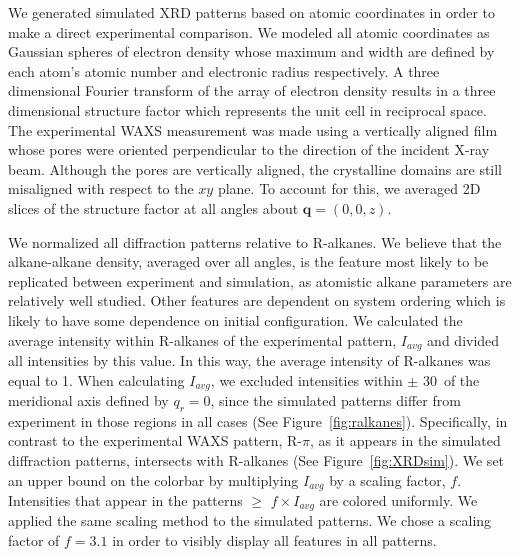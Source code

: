 \documentclass[journal=jpcbfk,manuscript=article]{achemso}
\begin{document}
  We generated simulated XRD patterns based on atomic coordinates in order to
  make a direct experimental comparison. We modeled all atomic coordinates as
  Gaussian spheres of electron density whose maximum and width are defined by
  each atom's atomic number and electronic radius respectively. A three dimensional
  Fourier transform of the array of electron density results in a three
  dimensional structure factor which represents the unit cell in reciprocal
  space. The experimental WAXS measurement was made using a vertically aligned
  film whose pores were oriented perpendicular to the direction of the incident
  X-ray beam. 
  Although the pores are vertically aligned, the crystalline domains are
  still misaligned with respect to the $xy$ plane. To account for this, we averaged
  2D slices of the structure factor at all angles about $\mathbf{q} = (0, 0, z)$. 

  We normalized all diffraction patterns relative to R-alkanes. We believe that
  the alkane-alkane density, averaged over all angles, is the feature most likely
  to be replicated between experiment and simulation, as atomistic alkane
  parameters are relatively well studied. Other features are dependent on system
  ordering which is likely to have some dependence on initial configuration.  We
  calculated the average intensity within R-alkanes of the experimental pattern,
  $I_{avg}$ and divided all intensities by this value. In this way, the average
  intensity of R-alkanes was equal to 1. When calculating $I_{avg}$, we excluded
  intensities within $\pm$ 30\degree~of the meridional axis defined by $q_r=0$,
  since the simulated patterns differ from experiment in those regions in all
  cases (See Figure~\ref{fig:ralkanes}). Specifically, in contrast to the
  experimental WAXS pattern, R-$\pi$, as it appears in the simulated diffraction
  patterns, intersects with R-alkanes (See Figure~\ref{fig:XRDsim}). We set an
  upper bound on the colorbar by multiplying $I_{avg}$ by a scaling factor, $f$.
  Intensities that appear in the patterns $\geq$ $f\times I_{avg}$ are colored
  uniformly.  We applied the same scaling method to the simulated patterns. We
  chose a scaling factor of $f=3.1$ in order to visibly display all
  features in all patterns.

\end{document}
